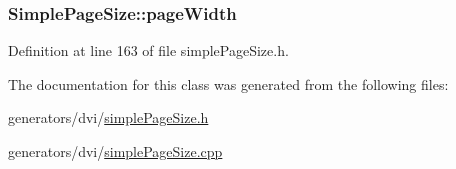 \hypertarget{classSimplePageSize_ad5aa26a1789bd7b20dbca509a50cfcab}{
\subsubsection[{page\+Width}]{ Simple\+Page\+Size\+::page\+Width\hspace{0.3cm}{\ttfamily [protected]}}}\label{classSimplePageSize_ad5aa26a1789bd7b20dbca509a50cfcab}


Definition at line 163 of file simple\+Page\+Size.\+h.



The documentation for this class was generated from the following files\+:\begin{DoxyCompactItemize}
\item 
generators/dvi/\hyperlink{simplePageSize_8h}{simple\+Page\+Size.\+h}\item 
generators/dvi/\hyperlink{simplePageSize_8cpp}{simple\+Page\+Size.\+cpp}\end{DoxyCompactItemize}
